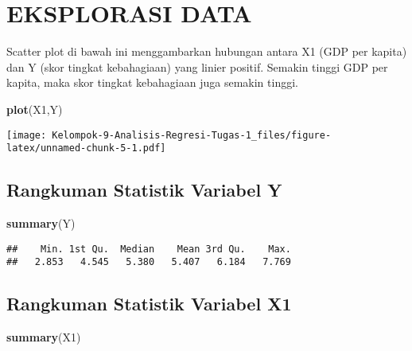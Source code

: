 \documentclass[
]{article}
\newenvironment{Shaded}{\begin{snugshade}}{\end{snugshade}}
\newcommand{\FunctionTok}[1]{\textcolor[rgb]{0.13,0.29,0.53}{\textbf{#1}}}
\newcommand{\NormalTok}[1]{#1}
\begin{document}
\hypertarget{eksplorasi-data}{%
\section{\texorpdfstring{ EKSPLORASI
DATA}{ EKSPLORASI DATA}}\label{eksplorasi-data}}

Scatter plot di bawah ini menggambarkan hubungan antara X1 (GDP per
kapita) dan Y (skor tingkat kebahagiaan) yang linier positif. Semakin
tinggi GDP per kapita, maka skor tingkat kebahagiaan juga semakin
tinggi.

\begin{Shaded}
\begin{Highlighting}[]
\FunctionTok{plot}\NormalTok{(X1,Y)}
\end{Highlighting}
\end{Shaded}

\texttt{[image: Kelompok-9-Analisis-Regresi-Tugas-1\_files/figure-latex/unnamed-chunk-5-1.pdf]}

\hypertarget{rangkuman-statistik-variabel-y}{%
\subsection{\texorpdfstring{ Rangkuman Statistik Variabel
Y}{ Rangkuman Statistik Variabel Y}}\label{rangkuman-statistik-variabel-y}}

\begin{Shaded}
\begin{Highlighting}[]
\FunctionTok{summary}\NormalTok{(Y)}
\end{Highlighting}
\end{Shaded}

\begin{verbatim}
##    Min. 1st Qu.  Median    Mean 3rd Qu.    Max. 
##   2.853   4.545   5.380   5.407   6.184   7.769
\end{verbatim}

\hypertarget{rangkuman-statistik-variabel-x1}{%
\subsection{\texorpdfstring{ Rangkuman Statistik Variabel
X1}{ Rangkuman Statistik Variabel X1}}\label{rangkuman-statistik-variabel-x1}}

\begin{Shaded}
\begin{Highlighting}[]
\FunctionTok{summary}\NormalTok{(X1)}
\end{Highlighting}
\end{Shaded}
\end{document}
